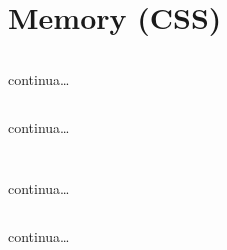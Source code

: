 \section[Memory]{Memory (CSS)}


\begin{frame}[fragile]\transfade
  \begin{sol}\centering
    \inputminted[lastline=17]{html}{memory/css/memory.html}
    continua\dots
  \end{sol}
\end{frame}
\begin{frame}[fragile]\transfade
  \begin{sol}\centering
    \inputminted[firstline=18, lastline=44, fontsize=\tiny]{html}{memory/css/memory.html}
    continua\dots
  \end{sol}
\end{frame}
\begin{frame}[fragile]\transfade
  \begin{sol}\centering
    \inputminted[firstline=47, breaklines]{html}{memory/css/memory.html}
  \end{sol}
\end{frame}


\begin{frame}[fragile]\transfade
  \begin{sol}\centering
    \inputminted[breaklines, lastline=21]{css}{memory/css/memory.css}
    continua\dots
  \end{sol}
\end{frame}
\begin{frame}[fragile]\transfade
  \begin{sol}\centering
    \inputminted[breaklines, firstline=23, lastline=44]{css}{memory/css/memory.css}
    continua\dots
  \end{sol}
\end{frame}
\begin{frame}[fragile]\transfade
  \begin{sol}\centering
    \inputminted[breaklines, firstline=46]{css}{memory/css/memory.css}
  \end{sol}
\end{frame}